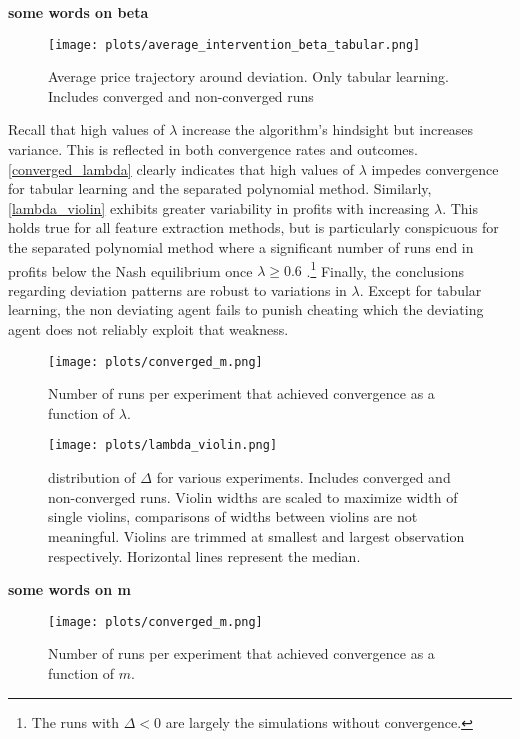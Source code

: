 

\textbf{some words on beta}

\begin{figure}
	\texttt{[image: plots/average\_intervention\_beta\_tabular.png]}
	\caption{Average price trajectory around deviation. Only tabular learning. Includes converged and non-converged runs}
	\label{average_intervention_beta_tabular}
\end{figure}

Recall that high values of $\lambda$ increase the algorithm's hindsight but increases variance. This is reflected in both convergence rates and outcomes. \autoref{converged_lambda} clearly indicates that high values of $\lambda$ impedes convergence for tabular learning and the separated polynomial method. Similarly, \autoref{lambda_violin} exhibits greater variability in profits with increasing $\lambda$. This holds true for all feature extraction methods, but is particularly conspicuous for the separated polynomial method where a significant number of runs end in profits below the Nash equilibrium once $\lambda \ge 0.6$ .\footnote{The runs with $\Delta <0$ are largely the simulations without convergence.} Finally, the conclusions regarding deviation patterns are robust to variations in $\lambda$. Except for tabular learning, the non deviating agent fails to punish cheating which the deviating agent does not reliably exploit that weakness.

\begin{figure}
	\texttt{[image: plots/converged\_m.png]}
	\caption{Number of runs per experiment that achieved convergence as a function of $\lambda$.}
	\label{converged_lambda}
\end{figure}

\begin{figure}
	\texttt{[image: plots/lambda\_violin.png]}
	\caption{distribution of $\Delta$ for various experiments. Includes converged and non-converged runs. Violin widths are scaled to maximize width of single violins, comparisons of widths between violins are not meaningful. Violins are trimmed at smallest and largest observation respectively. Horizontal lines represent the median.}
	\label{lambda_violin}
\end{figure}


\textbf{some words on m}


\begin{figure}
	\texttt{[image: plots/converged\_m.png]}
	\caption{Number of runs per experiment that achieved convergence as a function of $m$.}
	\label{converged_m}
\end{figure}


